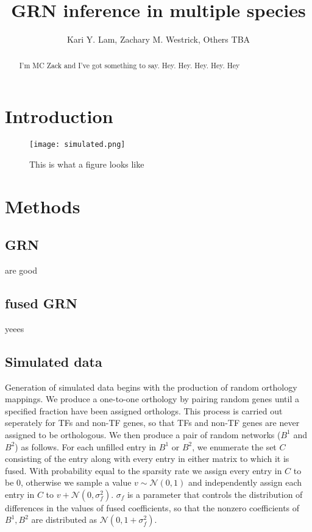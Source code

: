 \documentclass[11pt]{article}
\begin{document}
\title{GRN inference in multiple species}
\author{Kari Y. Lam, Zachary M. Westrick, Others TBA}
\maketitle

\begin{abstract}
I'm MC Zack and I've got something to say. Hey. Hey. Hey. Hey. Hey
\end{abstract}

\section{Introduction}

\begin{figure}
\begin{center}
  \texttt{[image: simulated.png]}
  \caption{\label{fig:figure1} This is what a figure looks like}
  \end{center}
\end{figure}

\section{Methods}
\subsection{GRN}
are good
\subsection{fused GRN}
yeees
\subsection{Simulated data}
Generation of simulated data begins with the production of random orthology mappings. We produce a one-to-one orthology by pairing random genes until a specified fraction have been assigned orthologs. This process is carried out seperately for TFs and non-TF genes, so that TFs and non-TF genes are never assigned to be orthologous. We then produce a pair of random networks ($B^1$ and $B^2$) as follows. For each unfilled entry in $B^1$ or $B^2$, we enumerate the set $C$ consisting of the entry along with every entry in either matrix to which it is fused. With probability equal to the sparsity rate we assign every entry in $C$ to be 0, otherwise we sample a value $v \sim \mathcal{N}(0,1)$ and independently assign each entry in $C$ to $v + \mathcal{N}(0, \sigma_f^2)$. $\sigma_f$ is a parameter that controls the distribution of differences in the values of fused coefficients, so that the nonzero coefficients of $B^1, B^2$ are distributed as $\mathcal{N}(0, 1 + \sigma_f^2)$.
\end{document}
